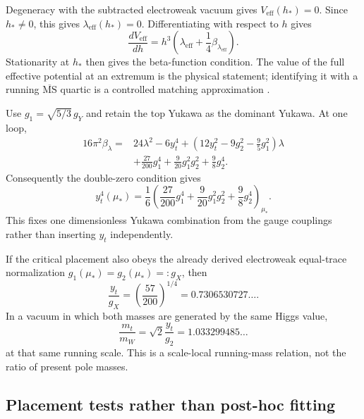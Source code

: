 \begin{proofsketch}
Degeneracy with the subtracted electroweak vacuum gives
$V_{\mathrm{eff}}(h_*)=0$.  Since $h_*\ne0$, this gives
$\lambda_{\mathrm{eff}}(h_*)=0$.  Differentiating with respect to $h$ gives
\[
 \frac{dV_{\mathrm{eff}}}{dh}
 =h^3\left(\lambda_{\mathrm{eff}}
       +\frac14\beta_{\lambda_{\mathrm{eff}}}\right).
\]
Stationarity at $h_*$ then gives the beta-function condition.  The value of the
full effective potential at an extremum is the physical statement; identifying it
with a running $\overline{\mathrm{MS}}$ quartic is a controlled matching
approximation \cite{buttazzo-criticality}.
\end{proofsketch}

\begin{theorem}
\label{thm:cba-sm-sum-rule}
Use $g_1=\sqrt{5/3}\,g_Y$ and retain the top Yukawa as the dominant Yukawa.
At one loop,
\[
\begin{aligned}
16\pi^2\beta_\lambda
={}&24\lambda^2-6y_t^4
 +\left(12y_t^2-9g_2^2-\frac95g_1^2\right)\lambda\\
&+\frac{27}{200}g_1^4
 +\frac9{20}g_1^2g_2^2
 +\frac98g_2^4.
\end{aligned}
\]
Consequently the double-zero condition gives
\[
 \boxed{
 y_t^4(\mu_*)
 =\frac16\left(
 \frac{27}{200}g_1^4
 +\frac9{20}g_1^2g_2^2
 +\frac98g_2^4
 \right)_{\mu_*}.}
\]
This fixes one dimensionless Yukawa combination from the gauge couplings rather
than inserting $y_t$ independently.
\end{theorem}

\begin{corollary}
\label{cor:cba-equal-trace-ratio}
If the critical placement also obeys the already derived electroweak equal-trace
normalization $g_1(\mu_*)=g_2(\mu_*)=:g_X$, then
\[
 \boxed{
 \frac{y_t}{g_X}
 =\left(\frac{57}{200}\right)^{1/4}
 =0.7306530727\ldots .}
\]
In a vacuum in which both masses are generated by the same Higgs value,
\[
 \boxed{
 \frac{m_t}{m_W}
 =\sqrt2\frac{y_t}{g_2}
 =1.033299485\ldots }
\]
at that same running scale.  This is a scale-local running-mass relation, not the
ratio of present pole masses.
\end{corollary}

\subsection{Placement tests rather than post-hoc fitting}

